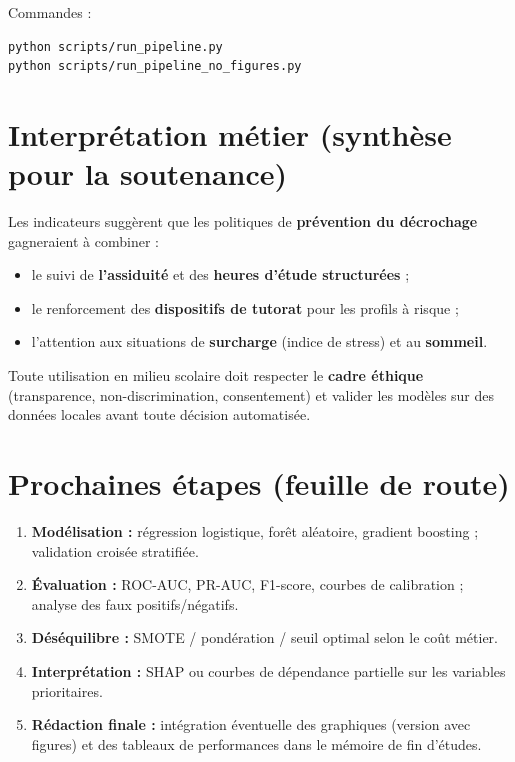 \documentclass[a4paper,11pt]{article}
\begin{document}
\noindent Commandes :
\begin{verbatim}
python scripts/run_pipeline.py
python scripts/run_pipeline_no_figures.py
\end{verbatim}

\section{Interprétation métier (synthèse pour la soutenance)}

Les indicateurs suggèrent que les politiques de \textbf{prévention du décrochage} gagneraient à combiner :
\begin{itemize}[leftmargin=*]
  \item le suivi de \textbf{l'assiduité} et des \textbf{heures d'étude structurées} ;
  \item le renforcement des \textbf{dispositifs de tutorat} pour les profils à risque ;
  \item l'attention aux situations de \textbf{surcharge} (indice de stress) et au \textbf{sommeil}.
\end{itemize}
Toute utilisation en milieu scolaire doit respecter le \textbf{cadre éthique} (transparence, non-discrimination, consentement) et valider les modèles sur des données locales avant toute décision automatisée.

\section{Prochaines étapes (feuille de route)}

\begin{enumerate}[leftmargin=*]
  \item \textbf{Modélisation :} régression logistique, forêt aléatoire, gradient boosting ; validation croisée stratifiée.
  \item \textbf{Évaluation :} ROC-AUC, PR-AUC, F1-score, courbes de calibration ; analyse des faux positifs/négatifs.
  \item \textbf{Déséquilibre :} SMOTE / pondération / seuil optimal selon le coût métier.
  \item \textbf{Interprétation :} SHAP ou courbes de dépendance partielle sur les variables prioritaires.
  \item \textbf{Rédaction finale :} intégration éventuelle des graphiques (version avec figures) et des tableaux de performances dans le mémoire de fin d'études.
\end{enumerate}
\end{document}
